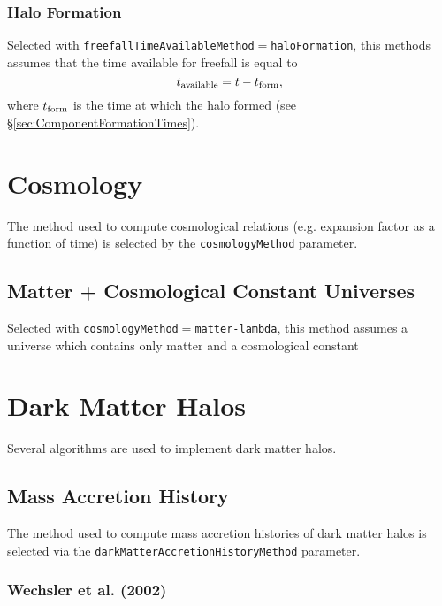\subsubsection{Halo Formation}

Selected with {\tt freefallTimeAvailableMethod}$=${\tt haloFormation}, this methods assumes that the time available for freefall is equal to
\begin{equation}
 t_{\rm available} = t - t_{\rm form},
\end{equation}
where $t_{\rm form}$ is the time at which the halo formed (see \S\ref{sec:ComponentFormationTimes}).

\section{Cosmology}

The method used to compute cosmological relations (e.g. expansion factor as a function of time) is selected by the {\tt cosmologyMethod} parameter.

\subsection{Matter + Cosmological Constant Universes}

Selected with {\tt cosmologyMethod}$=${\tt matter-lambda}, this method assumes a universe which contains only matter and a cosmological constant

\section{Dark Matter Halos}

Several algorithms are used to implement dark matter halos.

\subsection{Mass Accretion History}

The method used to compute mass accretion histories of dark matter halos is selected via the {\tt darkMatterAccretionHistoryMethod} parameter.

\subsubsection{Wechsler et al. (2002)}

